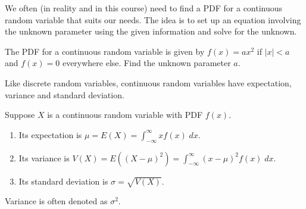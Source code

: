 \documentclass[../main.tex]{subfiles}
\begin{document}
We often (in reality and in this course) need to find a PDF for a continuous random variable that suits our needs.  The idea is to set up an equation involving the unknown parameter using the given information and solve for the unknown.

\begin{example} \label{ex:distribution-with-unknown-bounds}
  The PDF for a continuous random variable is given by \(f(x) = a x^{2}\) if \(|x| < a\) and \(f(x) = 0\) everywhere else.  Find the unknown parameter \(a\).

  \blanks*
\end{example}
\clearpage

Like discrete random variables, continuous random variables have expectation, variance and standard deviation.

\begin{definition} \label{def:crv-expectation-variance}
  Suppose \(X\) is a continuous random variable with PDF \(f(x)\).  
  \begin{enumerate}[itemsep={1ex}]
    \item Its expectation is \(\mu = E(X) = \int_{-\infty}^{\infty} x f(x) \;dx\).
    \item Its variance is \(V(X) = E\left( (X - \mu)^{2} \right) = \int_{-\infty}^{\infty} (x - \mu)^{2} f(x) \;dx\).
    \item Its standard deviation is \(\sigma = \sqrt{V(X)}\).
  \end{enumerate}

  Variance is often denoted as \(\sigma^{2}\).
\end{definition}
\end{document}
